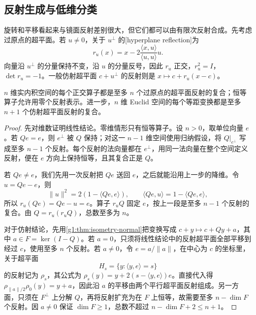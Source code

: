 \subsection{反射生成与低维分类}
\label{g1:subsec:0103:04}

旋转和平移看起来与镜面反射差别很大，但它们都可以由有限次反射合成。先考虑过原点的超平面。若 \(u\ne0\)，关于 \(u^\perp\) 的[hyperplane reflection]为
\[
	r_u(x)=x-2\frac{\langle x,u\rangle}{\langle u,u\rangle}u.
\]
向量沿 \(u^\perp\) 的分量保持不变，沿 \(u\) 的分量反号，因此 \(r_u\) 正交，\(r_u^2=I\)，\(\det r_u=-1\)。一般仿射超平面 \(c+u^\perp\) 的反射则是 \(x\mapsto c+r_u(x-c)\)。

\begin{theorem}
	\label{g1:thm:reflection-generation}
	\(n\) 维实内积空间的每个正交算子都是至多 \(n\) 个过原点的超平面反射的复合；恒等算子允许用零个反射表示。进一步，\(n\) 维 Euclid 空间的每个等距变换都是至多 \(n+1\) 个仿射超平面反射的复合。
\end{theorem}

\begin{proof}
	先对维数证明线性结论。零维情形只有恒等算子。设 \(n>0\)，取单位向量 \(e\)。若 \(Qe=e\)，则 \(e^\perp\) 被 \(Q\) 保持；对这一 \(n-1\) 维空间使用归纳假设，将 \(Q|_{e^\perp}\) 写成至多 \(n-1\) 个反射。每个反射的法向量都在 \(e^\perp\)，用同一法向量在整个空间定义反射，便在 \(e\) 方向上保持恒等，且其复合正是 \(Q\)。

	若 \(Qe\ne e\)，我们先用一次反射把 \(Qe\) 送回 \(e\)，之后就能沿用上一步的降维。令 \(u=Qe-e\)，则
	\[
		\lVert u\rVert^2=2(1-\langle Qe,e\rangle),
		\qquad
		\langle Qe,u\rangle=1-\langle Qe,e\rangle,
	\]
	所以 \(r_u(Qe)=Qe-u=e\)。算子 \(r_uQ\) 固定 \(e\)，按上一段是至多 \(n-1\) 个反射的复合。由 \(Q=r_u(r_uQ)\)，总数至多为 \(n\)。

	对于仿射结论，先用\cref{g1:thm:isometry-normal}把变换写成 \(c+y\mapsto c+Qy+a\)，其中 \(a\in F=\ker(I-Q)\)。若 \(a=0\)，只须将线性结论中的反射超平面全部平移到经过 \(c\)，使用至多 \(n\) 个反射。若 \(a\ne0\)，令 \(e=a/\lVert a\rVert\)，在中心为 \(c\) 的坐标里，关于超平面
	\[
		H_s=\{y:\langle y,e\rangle=s\}
	\]
	的反射记为 \(\rho_s\)，其公式为 \(\rho_s(y)=y+2(s-\langle y,e\rangle)e\)。直接代入得 \(\rho_{\lVert a\rVert/2}\rho_0(y)=y+a\)，因此沿 \(a\) 的平移由两个平行超平面反射组成。另一方面，只须在 \(F^\perp\) 上分解 \(Q\)，再将反射扩充为在 \(F\) 上恒等，故需要至多 \(n-\dim F\) 个反射。因 \(a\ne0\) 保证 \(\dim F\geq1\)，总数不超过 \(n-\dim F+2\leq n+1\)。
\end{proof}

